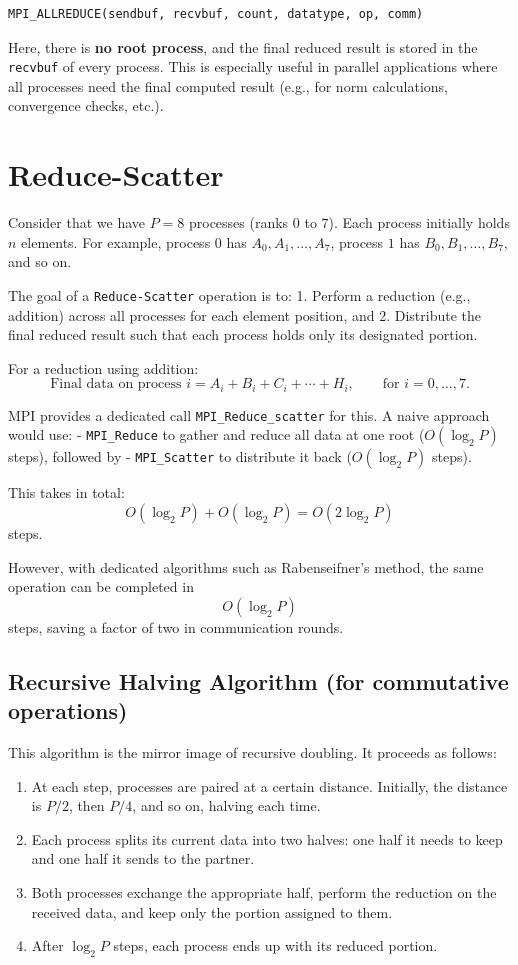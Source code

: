 \documentclass[12pt]{book}
\begin{document}
\begin{lstlisting}[style=cppstyle]
MPI_ALLREDUCE(sendbuf, recvbuf, count, datatype, op, comm)
\end{lstlisting}
Here, there is \textbf{no root process}, and the final reduced result is stored in the \texttt{recvbuf} of every process. This is especially useful in parallel applications where all processes need the final computed result (e.g., for norm calculations, convergence checks, etc.).


\section*{Reduce-Scatter}

Consider that we have $P=8$ processes (ranks $0$ to $7$). Each process initially holds $n$ elements. 
For example, process $0$ has $A_0, A_1, \ldots, A_7$, process $1$ has $B_0, B_1, \ldots, B_7$, and so on.

The goal of a \texttt{Reduce-Scatter} operation is to:
1. Perform a reduction (e.g., addition) across all processes for each element position, and
2. Distribute the final reduced result such that each process holds only its designated portion.

For a reduction using addition:
\[
\text{Final data on process }i = A_i + B_i + C_i + \cdots + H_i, \qquad \text{for } i=0,\ldots,7.
\]

MPI provides a dedicated call \texttt{MPI\_Reduce\_scatter} for this.
A naive approach would use:
- \texttt{MPI\_Reduce} to gather and reduce all data at one root ($O(\log_2 P)$ steps), followed by
- \texttt{MPI\_Scatter} to distribute it back ($O(\log_2 P)$ steps).

This takes in total:
\[
O(\log_2 P) + O(\log_2 P) = O(2 \log_2 P)
\]
steps.

However, with dedicated algorithms such as Rabenseifner's method, the same operation can be completed in
\[
O(\log_2 P)
\]
steps, saving a factor of two in communication rounds.


\subsection*{Recursive Halving Algorithm (for commutative operations)}

This algorithm is the mirror image of recursive doubling. It proceeds as follows:

\begin{enumerate}
  \item At each step, processes are paired at a certain distance. Initially, the distance is $P/2$, then $P/4$, and so on, halving each time.
  \item Each process splits its current data into two halves: one half it needs to keep and one half it sends to the partner.
  \item Both processes exchange the appropriate half, perform the reduction on the received data, and keep only the portion assigned to them.
  \item After $\log_2 P$ steps, each process ends up with its reduced portion.
\end{enumerate}
\end{document}
